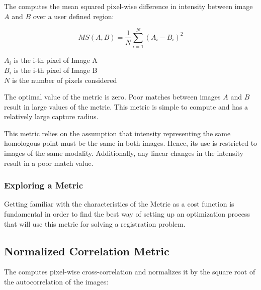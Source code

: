 The  computes the mean squared
pixel-wise difference in intensity between image $A$ and $B$ over a user
defined region:

\begin{equation}
MS(A,B) = \frac{1}{N} \sum_{i=1}^N \left( A_i - B_i \right)^2
\end{equation}
\begin{center}
$A_i$ is the i-th pixel of Image A\\ 
$B_i$ is the i-th pixel of Image B\\
$N$ is the number of pixels considered
\end{center}

The optimal value of the metric is zero. Poor matches between images $A$ and
$B$ result in large values of the metric. This metric is simple to compute and
has a relatively large capture radius.

This metric relies on the assumption that intensity representing the same
homologous point must be the same in both images. Hence, its use is restricted
to images of the same modality. Additionally, any linear changes in the
intensity result in a poor match value.

\subsubsection{Exploring a Metric}
\label{sec:ExploringAMetric}

Getting familiar with the characteristics of the Metric as a cost function is
fundamental in order to find the best way of setting up an optimization process
that will use this metric for solving a registration problem.




\subsection{Normalized Correlation Metric}
\label{sec:NormalizedCorrelationMetric}

The  computes pixel-wise
cross-correlation and normalizes it by the square root of the autocorrelation
of the images:

